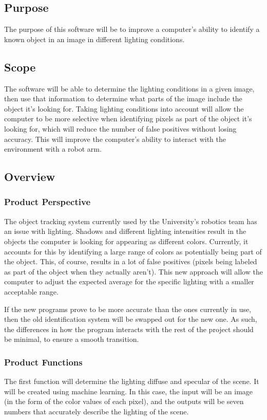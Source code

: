 \documentclass[10pt,journal,compsoc, draftclsnofoot,onecolumn]{IEEEtran}
\begin{document}
\subsection{Purpose}
The purpose of this software will be to improve a computer's ability to identify a known object in an image in different lighting conditions.

\subsection{Scope}
The software will be able to determine the lighting conditions in a given image, then use that information to determine what parts of the image include the object it's looking for. Taking lighting conditions into account will allow the computer to be more selective when identifying pixels as part of the object it's looking for, which will reduce the number of false positives without losing accuracy. This will improve the computer's ability to interact with the environment with a robot arm.


\subsection{Overview}

\subsubsection{Product Perspective}
The object tracking system currently used by the University's robotics team has an issue with lighting. Shadows and different lighting intensities result in the objects the computer is looking for appearing as different colors. Currently, it accounts for this by identifying a large range of colors as potentially being part of the object. This, of course, results in a lot of false positives (pixels being labeled as part of the object when they actually aren't). This new approach will allow the computer to adjust the expected average for the specific lighting with a smaller acceptable range.

If the new programs prove to be more accurate than the ones currently in use, then the old identification system will be swapped out for the new one. As such, the differences in how the program interacts with the rest of the project should be minimal, to ensure a smooth transition.

\subsubsection{Product Functions}
The first function will determine the lighting diffuse and specular of the scene. It will be created using machine learning. In this case, the input will be an image (in the form of the color values of each pixel), and the outputs will be seven numbers that accurately describe the lighting of the scene.
\end{document}

